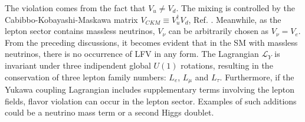 The violation comes from the fact that $V_u \neq V_d$. The mixing is controlled by the Cabibbo-Kobayashi-Maskawa matrix $V_{CKM}\equiv V^{\dagger}_u V_d $, Ref. \cite{PhysRevLett.10.531}. Meanwhile, as the lepton sector contains massless neutrinos, $V_{\nu}$ can be arbitrarily chosen as $V_{\nu}=V_e$. From the preceding discussions, it becomes evident that in the SM with massless neutrinos, there is no occurrence of LFV in any form. The Lagrangian $\mathscr{L}_Y$ is invariant under three indipendent global $U(1)$ rotations, resulting in the conservation of three lepton family numbers: $L_e$, $L_\mu$ and $L_\tau$. Furthermore, if the Yukawa coupling Lagrangian includes supplementary terms involving the lepton fields, flavor violation can occur in the lepton sector. Examples of such additions could be a neutrino mass term or a second Higgs doublet.

